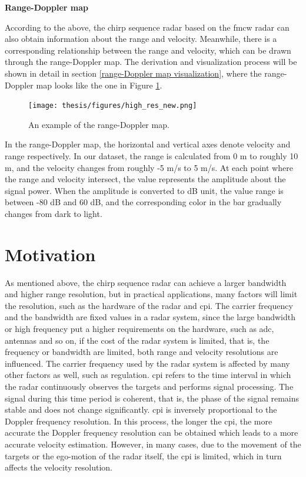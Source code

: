 \begin{spacing}{1.5}
\textbf{\large{Range-Doppler map}}
\end{spacing}

According to the above, the chirp sequence radar based on the \gls{fmcw} radar can also obtain information about the range and velocity. Meanwhile, there is a corresponding relationship between the range and velocity, which can be drawn through the range-Doppler map. The derivation and visualization process will be shown in detail in section \ref{range-Doppler map visualization}, where the range-Doppler map looks like the one in Figure \ref{an example of the range-Doppler map}.

\begin{figure}
	\centering
	\texttt{[image: thesis/figures/high\_res\_new.png]}
	\caption{An example of the range-Doppler map.}
	\label{an example of the range-Doppler map}
\end{figure}

In the range-Doppler map, the horizontal and vertical axes denote velocity and range respectively. In our dataset, the range is calculated from 0 m to roughly 10 m, and the velocity changes from roughly -5 m/s to 5 m/s. At each point where the range and velocity intersect, the value represents the amplitude about the signal power. When the amplitude is converted to dB unit, the value range is between -80 dB and 60 dB, and the corresponding color in the bar gradually changes from dark to light.


\section{Motivation} \label{motivation}
As mentioned above, the chirp sequence radar can achieve a larger bandwidth and higher range resolution, but in practical applications, many factors will limit the resolution, such as the hardware of the radar and \gls{cpi}. The carrier frequency and the bandwidth are fixed values in a radar system, since the large bandwidth or high frequency put a higher requirements on the hardware, such as \gls{adc}, antennas and so on, if the cost of the radar system is limited, that is, the frequency or bandwidth are limited, both range and velocity resolutions are influenced. The carrier frequency used by the radar system is affected by many other factors as well, such as regulation. \gls{cpi} refers to the time interval in which the radar continuously observes the targets and performs signal processing. The signal during this time period is coherent, that is, the phase of the signal remains stable and does not change significantly. \gls{cpi} is inversely proportional to the Doppler frequency resolution. In this process, the longer the \gls{cpi}, the more accurate the Doppler frequency resolution can be obtained which leads to a more accurate velocity estimation. However, in many cases, due to the movement of the targets or the ego-motion of the radar itself, the \gls{cpi} is limited, which in turn affects the velocity resolution.

